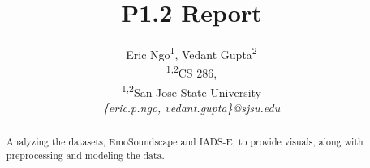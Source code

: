 \documentclass[conference]{IEEEtran}
\newcommand*{\affaddr}[1]{#1} %
\newcommand*{\affmark}[1][*]{\textsuperscript{#1}}
\newcommand*{\email}[1]{\textit{#1}}
\begin{document}
\title{P1.2 Report}


\author{%
Eric Ngo\affmark[1], Vedant Gupta\affmark[2]\\
\affaddr{\affmark[1,2]CS 286,}

\affaddr{\affmark[1,2]San Jose State University}\\

\email{\{eric.p.ngo, vedant.gupta\}@sjsu.edu}\\
}


\maketitle

\let\thefootnote\relax{}

\noindent
\begin{abstract}
\noindent
Analyzing the datasets, EmoSoundscape and IADS-E, to provide visuals, along with preprocessing and modeling the data. \\
\end{abstract}
\end{document}

